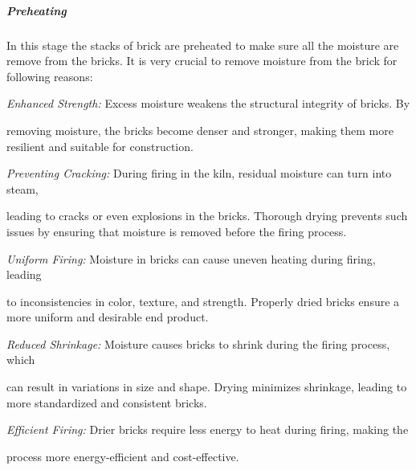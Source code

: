 \subparagraph{Preheating}
\begin{adjustwidth}{1.5em}{0em}
In this stage the stacks of brick are preheated to make sure all the moisture are remove from the bricks. It is very crucial to remove moisture from the brick for following reasons:

\vspace{0.1cm}
\textit{Enhanced Strength:}
 Excess moisture weakens the structural integrity of bricks. By \begin{adjustwidth}{1.5em}{0em}removing moisture, the bricks become denser and stronger, making them more resilient and suitable for construction.
 \vspace{0.1cm}
\end{adjustwidth}

\textit{Preventing Cracking:}
 During firing in the kiln, residual moisture can turn into steam, \begin{adjustwidth}{1.5em}{0em}leading to cracks or even explosions in the bricks. Thorough drying prevents such issues by ensuring that moisture is removed before the firing process.
\end{adjustwidth}

\textit{Uniform Firing:}
 Moisture in bricks can cause uneven heating during firing, leading \begin{adjustwidth}{1.5em}{0em}to inconsistencies in color, texture, and strength. Properly dried bricks ensure a more uniform and desirable end product.
 \vspace{0.1cm}
\end{adjustwidth}

\textit{Reduced Shrinkage:}
 Moisture causes bricks to shrink during the firing process, which \begin{adjustwidth}{1.5em}{0em}can result in variations in size and shape. Drying minimizes shrinkage, leading to more standardized and consistent bricks.
 \vspace{0.1cm}
\end{adjustwidth}

\textit{Efficient Firing:} Drier bricks require less energy to heat during firing, making the \begin{adjustwidth}{1.5em}{0em}process more energy-efficient and cost-effective.
 \vspace{0.1cm}
\end{adjustwidth}
\end{adjustwidth}
